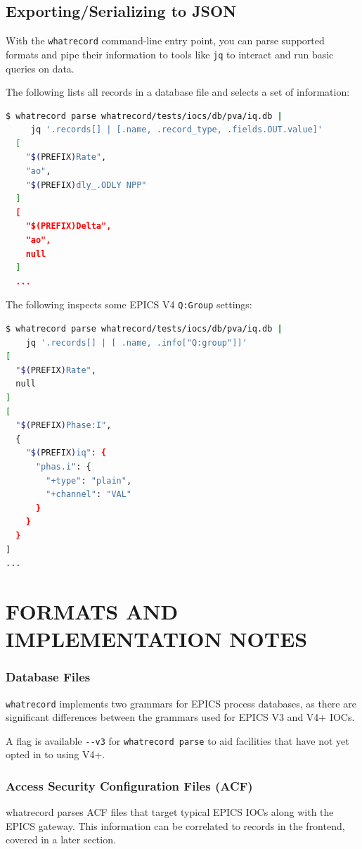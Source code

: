 \documentclass[letter,
               keeplastbox,   %
               ]{jacow}
\begin{document}
\subsection{Exporting/Serializing to JSON}

With the \verb_whatrecord_ command-line entry point, you can parse supported formats
and pipe their information to tools like \verb_jq_\cite{jq} to interact and run
basic queries on data.

The following lists all records in a database file and selects a set of
information:
\begin{lstlisting}[language=bash]
  $ whatrecord parse whatrecord/tests/iocs/db/pva/iq.db |
     jq '.records[] | [.name, .record_type, .fields.OUT.value]'
  [
    "$(PREFIX)Rate",
    "ao",
    "$(PREFIX)dly_.ODLY NPP"
  ]
  [
    "$(PREFIX)Delta",
    "ao",
    null
  ]
  ...
\end{lstlisting}

The following inspects some EPICS V4 \verb_Q:Group_ settings:

\begin{lstlisting}[language=bash]
$ whatrecord parse whatrecord/tests/iocs/db/pva/iq.db | 
    jq '.records[] | [ .name, .info["Q:group"]]'
[
  "$(PREFIX)Rate",
  null
]
[
  "$(PREFIX)Phase:I",
  {
    "$(PREFIX)iq": {
      "phas.i": {
        "+type": "plain",
        "+channel": "VAL"
      }
    }
  }
]
...

\end{lstlisting}

\section{FORMATS AND IMPLEMENTATION NOTES}

\subsubsection{Database Files}

\verb_whatrecord_ implements two grammars for EPICS process databases, as there are
significant differences between the grammars used for EPICS V3 and V4+ IOCs.

A flag is available \verb_--v3_ for \verb_whatrecord parse_ to aid facilities
that have not yet opted in to using V4+.

\subsubsection{Access Security Configuration Files (ACF)} whatrecord parses ACF
files that target typical EPICS IOCs along with the EPICS gateway.  This
information can be correlated to records in the frontend, covered in a later
section.
\end{document}
